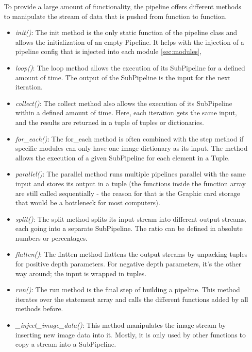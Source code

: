 To provide a large amount of functionality, the pipeline offers different methods to manipulate the stream of data that is pushed from function to function.

\begin{itemize}
    \item \textit{init()}: The init method is the only static function of the pipeline class and allows the initialization of an empty Pipeline. It helps with the injection of a pipeline config that is injected into each module \ref{sec:modules},

    \item \textit{loop()}: The loop method allows the execution of its SubPipeline for a defined amount of time. The output of the SubPipeline is the input for the next iteration.

    \item \textit{collect()}: The collect method also allows the execution of its SubPipeline within a defined amount of time. Here, each iteration gets the same input, and the results are returned in a tuple of tuples or dictionaries.

    \item \textit{for\_each()}: The for\_each method is often combined with the step method if specific modules can only have one image dictionary as its input. The method allows the execution of a given SubPipeline for each element in a Tuple.

    \item \textit{parallel()}: The parallel method runs multiple pipelines parallel with the same input and stores its output in a tuple (the functions inside the function array are still called sequentially - the reason for that is the Graphic card storage that would be a bottleneck for most computers).

    \item \textit{split()}: The split method splits its input stream into different output streams, each going into a separate SubPipeline. The ratio can be defined in absolute numbers or percentages.

    \item \textit{flatten()}: The flatten method flattens the output streams by unpacking tuples for positive depth parameters. For negative depth parameters, it's the other way around; the input is wrapped in tuples.

    \item \textit{run()}: The run method is the final step of building a pipeline. This method iterates over the statement array and calls the different functions added by all methods before.

    \item \textit{\_inject\_image\_data()}: This method manipulates the image stream by inserting new image data into it. Mostly, it is only used by other functions to copy a stream into a SubPipeline.

\end{itemize}

